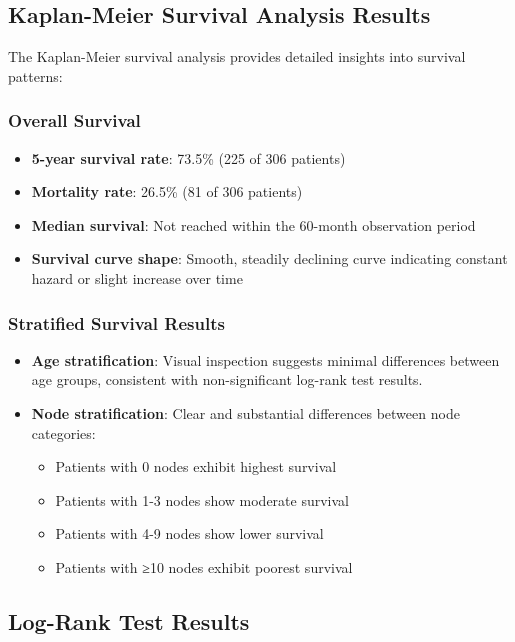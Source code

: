 \documentclass[12pt,a4paper]{article}
\begin{document}
\subsection{Kaplan-Meier Survival Analysis Results}

The Kaplan-Meier survival analysis provides detailed insights into survival patterns:

\subsubsection{Overall Survival}

\begin{itemize}
    \item \textbf{5-year survival rate}: 73.5\% (225 of 306 patients)
    \item \textbf{Mortality rate}: 26.5\% (81 of 306 patients)
    \item \textbf{Median survival}: Not reached within the 60-month observation period
    \item \textbf{Survival curve shape}: Smooth, steadily declining curve indicating constant hazard or slight increase over time
\end{itemize}

\subsubsection{Stratified Survival Results}

\begin{itemize}
    \item \textbf{Age stratification}: Visual inspection suggests minimal differences between age groups, consistent with non-significant log-rank test results.
    
    \item \textbf{Node stratification}: Clear and substantial differences between node categories:
    \begin{itemize}
        \item Patients with 0 nodes exhibit highest survival
        \item Patients with 1-3 nodes show moderate survival
        \item Patients with 4-9 nodes show lower survival
        \item Patients with ≥10 nodes exhibit poorest survival
    \end{itemize}
\end{itemize}

\subsection{Log-Rank Test Results}
\end{document}
